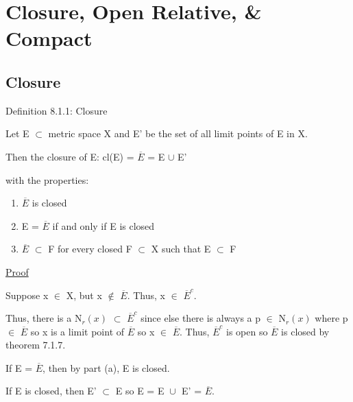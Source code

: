 \newpage
\section[Day 8: Open Relative and Compact]
{Closure, Open Relative, \& Compact}

\subsection{ Closure }

{ \color{blue} Definition 8.1.1: Closure } 

	\begin{adjustbox}{minipage=14cm, right, vspace=0.1cm 0cm}
        Let E $\subset$ metric space X and E' be the set of all
        limit points of E in X.

        \qquad Then the closure of E:
            \qquad cl(E) = $\overline{E}$ = E $\cup$ E'

        with the properties:
	\end{adjustbox}

	\begin{enumerate}[label=(\alph*), leftmargin=2cm, itemsep=0.4em]
        \item $\overline{E}$ is closed
        
        \item E = $\overline{E}$ if and only if E is closed
        
        \item $\overline{E}$ $\subset$ F for every closed F $\subset$ X
        such that E $\subset$ F
    \end{enumerate}

{ \color{magenta} \underline{Proof} } 

	Suppose x $\in$ X, but x $\not \in$ $\overline{E}$. Thus, x $\in$ $\overline{E}^c$.

	Thus, there is a N$_r(x)$ $\subset$ $\overline{E}^c$ since else there is
	always a p $\in$ N$_r(x)$ where p $\in$ $\overline{E}$ so x is a limit point
	of $\overline{E}$ so x $\in$ $\overline{E}$.
	Thus, $\overline{E}^c$ is open so $\overline{E}$ is closed by
	{\color{red} theorem 7.1.7}.

	\vspace{0.2cm}

	If E = $\overline{E}$, then by part (a), E is closed.

	If E is closed, then E' $\subset$ E so E = E $\cup_{}^{}$ E' = $\overline{E}$.

	\vspace{0.2cm}

